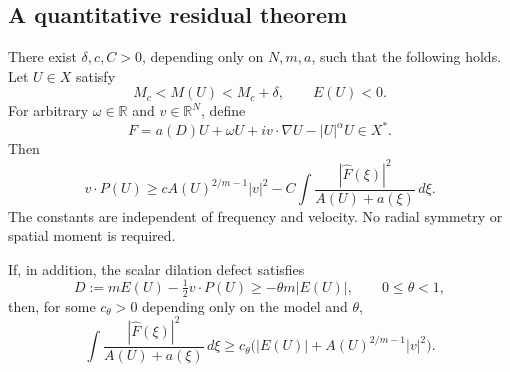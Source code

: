 \subsection{A quantitative residual theorem}

\begin{theorem}
\label{thm:r9rel-residual}
There exist $\delta,c,C>0$, depending only on $N,m,a$, such that
the following holds. Let $U\in X$ satisfy
\[
 M_c<M(U)<M_c+\delta,\qquad E(U)<0.
\]
For arbitrary $\omega\in\mathbb R$ and $v\in\mathbb R^N$, define
\[
 F=a(D)U+\omega U+iv\cdot\nabla U-|U|^\alpha U\in X^*.
\]
Then
\begin{equation}\label{eq:r9rel-residualinertia}
 v\cdot P(U)\ge cA(U)^{2/m-1}|v|^2
 -C\int\frac{|\widehat F(\xi)|^2}{A(U)+a(\xi)}\,d\xi.
\end{equation}
The constants are independent of frequency and velocity.
No radial symmetry or spatial moment is required.

If, in addition, the scalar dilation defect satisfies
\begin{equation}\label{eq:r9rel-defecthyp}
 D:=mE(U)-\tfrac12v\cdot P(U)
 \ge-\theta m|E(U)|,
 \qquad 0\le\theta<1,
\end{equation}
then, for some $c_\theta>0$ depending only on the model and $\theta$,
\begin{equation}\label{eq:r9rel-residuallower}
 \int\frac{|\widehat F(\xi)|^2}{A(U)+a(\xi)}\,d\xi
 \ge c_\theta\bigl(|E(U)|+A(U)^{2/m-1}|v|^2\bigr).
\end{equation}
\end{theorem}
